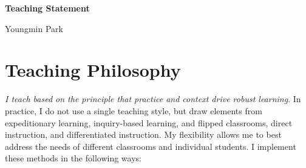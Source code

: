 \documentclass[a4paper,11pt]{article}
\begin{document}
\begin{center}
\Large \textbf{Teaching Statement}

\Large Youngmin Park
\end{center}



\section{Teaching Philosophy}

\textit{I teach based on the principle that practice and context drive robust learning}. In practice, I do not use a single teaching style, but draw elements from expeditionary learning, inquiry-based learning, and flipped classrooms, direct instruction, and differentiated instruction. My flexibility allows me to best address the needs of different classrooms and individual students. I implement these methods in the following ways:
\end{document}
